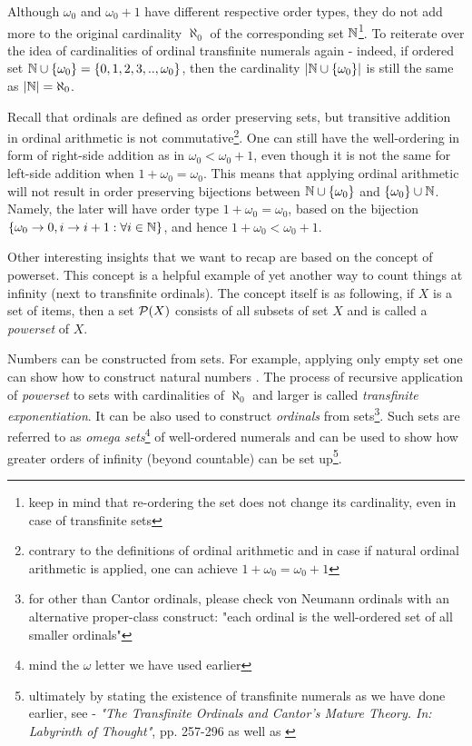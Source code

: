 Although $\omega_{0}$ and $\omega_{0} + 1$ have different respective order types, they do not add more to the original cardinality $\aleph_{0}$ of the corresponding set $\mathbb{N}$\footnote{keep in mind that re-ordering the set does not change its cardinality, even in case of transfinite sets}. To reiterate over the idea of cardinalities of ordinal transfinite numerals again - indeed, if ordered set $\mathbb{N} \cup \{\omega_{0}\} = \{0, 1, 2, 3, .., \omega_{0}\}$, then the cardinality $|\mathbb{N} \cup \{\omega_{0}\}|$ is still the same as $|\mathbb{N}| = \aleph_{0}$.

Recall that ordinals are defined as order preserving sets, but transitive addition in ordinal arithmetic is not commutative\footnote{contrary to the definitions of ordinal arithmetic and in case if natural ordinal arithmetic is applied, one can achieve $1 + \omega_{0} = \omega_{0} + 1$ }. One can still have the well-ordering in form of right-side addition as in $\omega_{0} < \omega_{0} + 1$, even though it is not the same for left-side addition when $1 + \omega_{0} = \omega_{0}$. This means that applying ordinal arithmetic will not result in order preserving bijections between $\mathbb{N} \cup \{\omega_{0}\}$ and $\{\omega_{0}\} \cup \mathbb{N}$. Namely, the later will have order type $1 + \omega_{0} = \omega_{0}$, based on the bijection $\{\omega_{0} \rightarrow 0, i \rightarrow i + 1 : \forall i \in \mathbb{N} \}$, and hence $1 + \omega_{0} < \omega_{0} + 1$.

Other interesting insights that we want to recap are based on the concept of powerset. This concept is a helpful example of yet another way to count things at infinity (next to transfinite ordinals). The concept itself is as following, if $X$ is a set of items, then a set $\mathcal{P}(X)$ consists of all subsets of set $X$ and is called a \textit{powerset} of $X$.

Numbers can be constructed from sets. For example, applying only empty set one can show how to construct natural numbers \cite{penrose2007road}. The process of recursive application of \textit{powerset} to sets with cardinalities of $\aleph_0$ and larger is called \textit{transfinite exponentiation}. It can be also used to construct \textit{ordinals} from sets\footnote{for other than Cantor ordinals, please check von Neumann ordinals with an alternative proper-class construct: "each ordinal is the well-ordered set of all smaller ordinals"}. Such sets are referred to as \textit{omega sets}\footnote{mind the $\omega$ letter we have used earlier} of well-ordered numerals and can be used to show how greater orders of infinity (beyond countable) can be set up\footnote{ultimately by stating the existence of transfinite numerals as we have done earlier, see - \textit{"The Transfinite Ordinals and Cantor’s Mature Theory. In: Labyrinth of Thought"}\cite{ferreiros2008labyrinth}, pp. 257-296 as well as \cite{kanamori1996mathematical}}.

